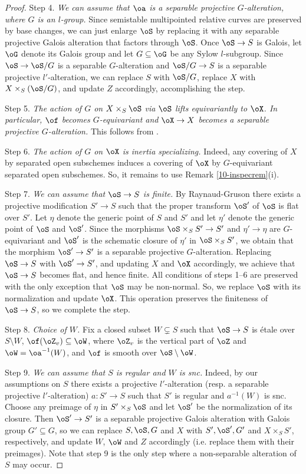 \documentclass[10pt]{../fichiers-configuration-latex/smfart}
\begin{document}
\begin{proof}
Step 4. {\it We can assume that $\oa$ is a separable projective $G$-alteration, where $G$
is an $l$-group.} Since semistable multipointed relative curves are preserved by base changes,
we can just enlarge $\oS$ by replacing it with any separable projective Galois alteration that
factors through $\oS$. Once $\oS\to S$ is Galois, let $\oG$ denote its Galois group and let
$G\subseteq\oG$ be any Sylow $l$-subgroup. Since $\oS\to\oS/G$ is a separable $G$-alteration
and $\oS/G\to S$ is a separable projective $l'$-alteration, we can replace $S$ with $\oS/G$,
replace $X$ with $X\times_S(\oS/G)$, and update $Z$ accordingly, accomplishing the step.

Step 5. {\it The action of $G$ on $X\times_S\oS$ via $\oS$ lifts equivariantly to $\oX$.
In particular, $\of$ becomes $G$-equivariant and $\oX\to X$ becomes a separable projective
$G$-alteration.} This follows from \cite[1.6]{Temkin@stable}.

Step 6. {\it The action of $G$ on $\oX$ is inertia specializing.} Indeed, any covering of
$X$ by separated open subschemes induces a covering of $\oX$ by $G$-equivariant separated
open subschemes. So, it remains to use Remark \ref{10-inspecrem}(i).

Step 7. {\it We can assume that $\oS\to S$ is finite.} By Raynaud-Gruson there exists
a projective modification $S'\to S$ such that the proper transform $\oS'$ of $\oS$ is
flat over $S'$. Let $\eta$ denote the generic point of $S$ and $S'$ and let $\eta'$
denote the generic point of $\oS$ and $\oS'$. Since the morphisms $\oS\times_SS'\to S'$
and $\eta'\to\eta$ are $G$-equivariant and $\oS'$ is the schematic closure of $\eta'$ in
$\oS\times_SS'$, we obtain that the morphism $\oS'\to S'$ is a separable projective $G$-alteration.
Replacing $\oS\to S$ with $\oS'\to S'$, and updating $X$ and $\oX$ accordingly, we achieve that
$\oS\to S$ becomes flat, and hence finite. All conditions of steps 1--6 are preserved with the
only exception that $\oS$ may be non-normal. So, we replace $\oS$ with its normalization and
update $\oX$. This operation preserves the finiteness of $\oS\to S$, so we complete the step.

Step 8. {\it Choice of $W$.} Fix a closed subset $W\subsetneq S$ such that $\oS\to S$ is étale
over $S\setminus W$, $\of(\oZ_v)\subseteq\oW$, where $\oZ_v$ is the vertical part of $\oZ$ and
$\oW=\oa^{-1}(W)$, and $\of$ is smooth over $\oS\setminus\oW$.

Step 9. {\it We can assume that $S$ is regular and $W$ is snc.} Indeed, by our assumptions on
$S$ there exists a projective $l'$-alteration (resp. a separable projective $l'$-alteration)
$a{\colon}S'\to S$ such that $S'$ is regular and $a^{-1}(W)$ is snc. Choose any preimage of
$\eta$ in $S'\times_S\oS$ and let $\oS'$ be the normalization of its closure. Then $\oS'\to S'$
is a separable projective Galois alteration with Galois group $G'\subseteq G$, so we can replace
$S,\oS, G$ and $X$ with $S',\oS', G'$ and $X\times_SS'$, respectively, and update $W$, $\oW$ and
$Z$ accordingly (i.e. replace them with their preimages). Note that step 9 is the only step where
a non-separable alteration of $S$ may occur.


\end{proof}
\end{document}

